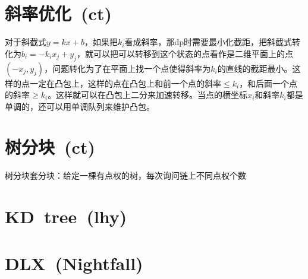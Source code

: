 \section{斜率优化\ \small(ct)}
	对于斜截式$ y = k x + b $，如果把$ k_i $看成斜率，那dp时需要最小化截距，把斜截式转化为$ b_i = - k_i x_j + y_j $，就可以把可以转移到这个状态的点看作是二维平面上的点$ (- x_j, y_j) $，问题转化为了在平面上找一个点使得斜率为$ k_i $的直线的截距最小。这样的点一定在凸包上，这样的点在凸包上和前一个点的斜率$ \leq k_i$，和后面一个点的斜率$ \geq k_i $。这样就可以在凸包上二分来加速转移。当点的横坐标$ x_i $和斜率$ k_i $都是单调的，还可以用单调队列来维护凸包。
\section{树分块\ \small(ct)}
	树分块套分块：给定一棵有点权的树，每次询问链上不同点权个数
\section{KD\ tree\ \small(lhy)}
\section{DLX\ \small(Nightfall)}

